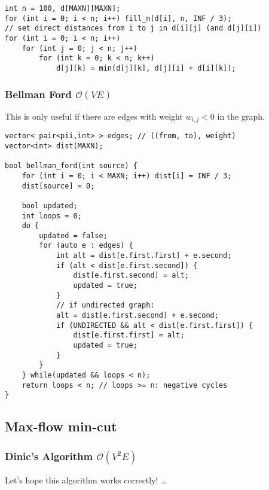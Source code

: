 \documentclass{article}
\begin{document}
\begin{lstlisting}
int n = 100, d[MAXN][MAXN];
for (int i = 0; i < n; i++) fill_n(d[i], n, INF / 3);
// set direct distances from i to j in d[i][j] (and d[j][i])
for (int i = 0; i < n; i++)
	for (int j = 0; j < n; j++)
		for (int k = 0; k < n; k++)
			d[j][k] = min(d[j][k], d[j][i] + d[i][k]);

\end{lstlisting}

\subsubsection{Bellman Ford $\mathcal{O}(V E)$}

This is only useful if there are edges with weight $w_{i,j} < 0$ in the graph.

\begin{lstlisting}
vector< pair<pii,int> > edges; // ((from, to), weight)
vector<int> dist(MAXN);

bool bellman_ford(int source) {
	for (int i = 0; i < MAXN; i++) dist[i] = INF / 3;
	dist[source] = 0;
	
	bool updated;
	int loops = 0;
	do {
		updated = false;
		for (auto e : edges) {
			int alt = dist[e.first.first] + e.second;
			if (alt < dist[e.first.second]) {
				dist[e.first.second] = alt;
				updated = true;
			}
			// if undirected graph:
			alt = dist[e.first.second] + e.second;
			if (UNDIRECTED && alt < dist[e.first.first]) {
				dist[e.first.first] = alt;
				updated = true;
			}
		}
	} while(updated && loops < n);
	return loops < n; // loops >= n: negative cycles
}

\end{lstlisting}

\subsection{Max-flow min-cut}
\subsubsection{Dinic's Algorithm $\mathcal{O}(V^{2} E)$}

Let's hope this algorithm works correctly! \dots
\end{document}

